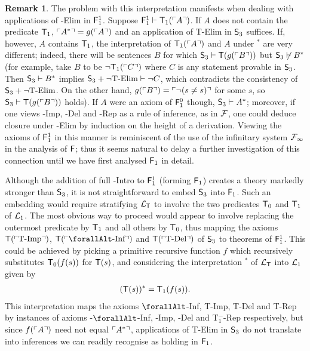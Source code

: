 \documentclass[UKenglish,cleveref,DIV=12]{scrartcl}
\let\forall\forallAlt
\theoremstyle{definition}
\theoremstyle{definition}
\newtheorem{remark}{Remark}
\begin{document}
\begin{remark}
The problem with this interpretation manifests when dealing with applications of
-Elim in $\mathsf{F}_1^1$. Suppose $\mathsf{F}_1^1\vdash \mathsf{T}_1(\ulcorner{A}\urcorner)$. If $A$ does not
contain the predicate $\mathsf{T}_1$, $\ulcorner{A^*}\urcorner=g(\ulcorner{A}\urcorner)$ and an application of T-Elim
in $\mathsf{S}_3$ suffices. If, however, $A$ contains $\mathsf{T}_1$,
the interpretation of $\mathsf{T}_1(\ulcorner{A}\urcorner)$ and $A$ under $^*$ are very different;
indeed, there will be sentences $B$ for which $\mathsf{S}_3\vdash \mathsf{T}(g(\ulcorner{B}\urcorner))$
but $\mathsf{S}_3\not\vdash  B^*$ (for example, take $B$ to be $\lnot \mathsf{T}_1(\ulcorner{C}\urcorner)$ where $C$ is any statement provable in $\mathsf{S}_3$. Then $\mathsf{S}_3\vdash B^*$ implies $\mathsf{S}_3+\text{$\lnot$T-Elim}\vdash \lnot C$, which contradicts the consistency of $\mathsf{S}_3+\text{$\lnot$T-Elim}$. On the other hand, $g(\ulcorner{B}\urcorner)=\ulcorner{\lnot(s\neq s)}\urcorner$ for some $s$, so $\mathsf{S}_3\vdash \mathsf{T}(g(\ulcorner{B}\urcorner))$ holds).
If $A$ were an axiom of $\mathsf{F}_1^0$ though, $\mathsf{S}_3\vdash A^*$; moreover, if one views -Imp, -Del and -Rep
as a rule of inference, as in $\mathcal{F}$, one could deduce
closure under -Elim by induction on the height of a derivation. Viewing
the axioms of $\mathsf{F}_1^1$ in this manner is
reminiscent of the use of the infinitary system $\mathcal{F}_\infty$ in the analysis of
$\mathsf{F}$; thus it seems natural to delay a further investigation of this connection
until we have first analysed $\mathsf{F}_1$ in detail.

Although the addition of full -Intro to $\mathsf{F}_1^1$ (forming $\mathsf{F}_1$) creates
a theory markedly stronger than $\mathsf{S}_3$, it is not straightforward to
embed $\mathsf{S}_3$ into $\mathsf{F}_1$. Such an embedding would require stratifying
$\mathcal{L}_{\mathsf{T}}$ to involve the two predicates $\mathsf{T}_0$ and $\mathsf{T}_1$ of $\mathcal{L}_1$. The most obvious
way to proceed would appear to involve replacing the outermost predicate by
$\mathsf{T}_1$ and all others by $\mathsf{T}_0$, thus mapping the axioms $\mathsf{T}(\ulcorner{\text{T-Imp}}\urcorner)$,
$\T(\gn{\text{$\forall$-Inf}})$ and $\mathsf{T}(\ulcorner{\text{T-Del}}\urcorner)$ of $\mathsf{S}_3$ to
theorems of $\mathsf{F}_1^1$. This could be achieved by picking a primitive recursive
function $f$ which recursively substitutes $\mathsf{T}_0(f(s))$ for $\mathsf{T}(s)$, and considering
the interpretation $^*$ of $\mathcal{L}_{\mathsf{T}}$ into $\mathcal{L}_1$ given by
\begin{align*}
 (\mathsf{T}(s))^*=\mathsf{T}_1(f(s)).
\end{align*}
This interpretation maps the axioms $\forall$-Inf, T-Imp, T-Del and
T-Rep by instances of axioms -$\forall$-Inf, -Imp, -Del and
T$_1^-$-Rep respectively, but since $f(\ulcorner{A}\urcorner)$ need not equal $\ulcorner{A^*}\urcorner$,
applications of T-Elim in $\mathsf{S}_3$ do not translate into inferences we can
readily recognise as holding in $\mathsf{F}_1$.
\end{remark}
\end{document}
